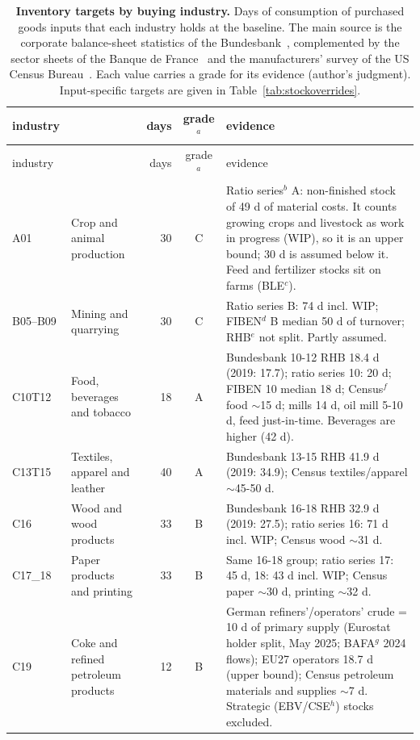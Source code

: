 \begingroup\footnotesize\setlength{\tabcolsep}{4pt}
\begin{longtable}{L{16mm}L{38mm}rcL{76mm}}
\caption{\textbf{Inventory targets by buying industry.} Days of consumption of purchased goods inputs that each industry holds at the baseline. The main source is the corporate balance-sheet statistics of the Bundesbank~\citep{bundesbank2025}, complemented by the sector sheets of the Banque de France~\citep{banquefrance2025fiben} and the manufacturers' survey of the US Census Bureau~\citep{census2026m3}. Each value carries a grade for its evidence (author's judgment). Input-specific targets are given in Table~\ref{tab:stockoverrides}.}
\label{tab:stocks} \\
\toprule
industry & & days & grade$^{a}$ & evidence \\
\midrule
\endfirsthead
\toprule
industry & & days & grade$^{a}$ & evidence \\
\midrule
\endhead
A01 & Crop and animal production & 30 & C & Ratio series$^{b}$ A: non-finished stock of 49 d of material costs. It counts growing crops and livestock as work in progress (WIP), so it is an upper bound; 30 d is assumed below it. Feed and fertilizer stocks sit on farms (BLE$^{c}$). \\
B05--B09 & Mining and quarrying & 30 & C & Ratio series B: 74 d incl. WIP; FIBEN$^{d}$ B median 50 d of turnover; RHB$^{e}$ not split. Partly assumed. \\
C10T12 & Food, beverages and tobacco & 18 & A & Bundesbank 10-12 RHB 18.4 d (2019: 17.7); ratio series 10: 20 d; FIBEN 10 median 18 d; Census$^{f}$ food $\sim$15 d; mills 14 d, oil mill 5-10 d, feed just-in-time. Beverages are higher (42 d). \\
C13T15 & Textiles, apparel and leather & 40 & A & Bundesbank 13-15 RHB 41.9 d (2019: 34.9); Census textiles/apparel $\sim$45-50 d. \\
C16 & Wood and wood products & 33 & B & Bundesbank 16-18 RHB 32.9 d (2019: 27.5); ratio series 16: 71 d incl. WIP; Census wood $\sim$31 d. \\
C17\_18 & Paper products and printing & 33 & B & Same 16-18 group; ratio series 17: 45 d, 18: 43 d incl. WIP; Census paper $\sim$30 d, printing $\sim$32 d. \\
C19 & Coke and refined petroleum products & 12 & B & German refiners'/operators' crude = 10 d of primary supply (Eurostat holder split, May 2025; BAFA$^{g}$ 2024 flows); EU27 operators 18.7 d (upper bound); Census petroleum materials and supplies $\sim$7 d. Strategic (EBV/CSE$^{h}$) stocks excluded. \\

\end{longtable}
